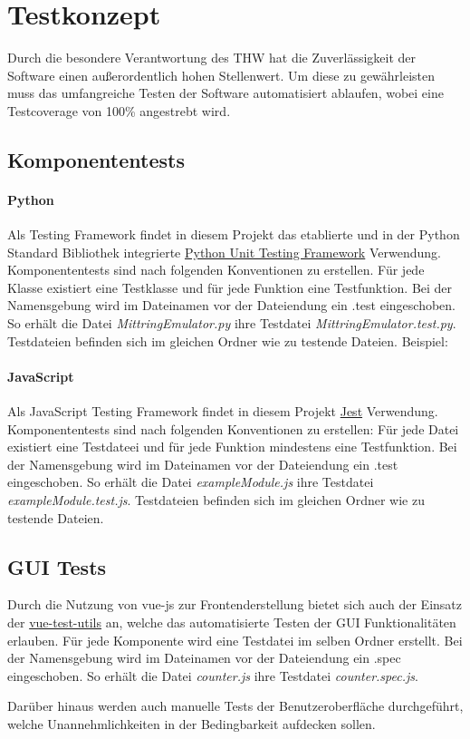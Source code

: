 \section{Testkonzept}
Durch die besondere Verantwortung des THW hat die Zuverlässigkeit der Software einen außerordentlich hohen Stellenwert. Um diese zu gewährleisten muss das umfangreiche Testen der Software automatisiert ablaufen, wobei eine Testcoverage von 100\% angestrebt wird.
\subsection{Komponententests}
\paragraph{Python}
Als Testing Framework findet in diesem Projekt das etablierte und in der Python Standard Bibliothek integrierte \href{https://docs.python.org/3/library/unittest.html}{Python Unit Testing Framework} Verwendung. Komponententests sind nach folgenden Konventionen zu erstellen. Für jede Klasse existiert eine Testklasse und für jede Funktion eine Testfunktion. Bei der Namensgebung wird im Dateinamen vor der Dateiendung ein .test eingeschoben. So erhält die Datei \textit{MittringEmulator.py} ihre Testdatei \textit{MittringEmulator.test.py}. Testdateien befinden sich im gleichen Ordner wie zu testende Dateien. Beispiel:
\paragraph{JavaScript}
Als JavaScript Testing Framework findet in diesem Projekt \href{https://facebook.github.io/jest/docs/en/getting-started.htmll}{Jest} Verwendung. Komponententests sind nach folgenden Konventionen zu erstellen: Für jede Datei existiert eine Testdateei und für jede Funktion mindestens eine Testfunktion. Bei der Namensgebung wird im Dateinamen vor der Dateiendung ein .test eingeschoben. So erhält die Datei \textit{exampleModule.js} ihre Testdatei \textit{exampleModule.test.js}. Testdateien befinden sich im gleichen Ordner wie zu testende Dateien.
\subsection{GUI Tests}
Durch die Nutzung von vue-js zur Frontenderstellung bietet sich auch der Einsatz der \href{https://vue-test-utils.vuejs.org/en/}{vue-test-utils} an, welche das automatisierte Testen der GUI Funktionalitäten erlauben. Für jede Komponente wird eine Testdatei im selben Ordner erstellt. Bei der Namensgebung wird im Dateinamen vor der Dateiendung ein .spec eingeschoben. So erhält die Datei \textit{counter.js} ihre Testdatei \textit{counter.spec.js}.

Darüber hinaus werden auch manuelle Tests der Benutzeroberfläche durchgeführt, welche Unannehmlichkeiten in der Bedingbarkeit aufdecken sollen.